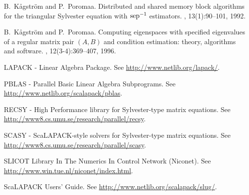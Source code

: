 \documentclass[11pt]{article}
\begin{document}
{\begin{thebibliography}{10}
B.~K{\aa}gstr{\"o}m and P.~Poromaa.
\newblock Distributed and shared memory block algorithms for the triangular
  {S}ylvester equation with {${\rm sep}\sp {-1}$} estimators.
, 13(1):90--101, 1992.

B.~K{\aa}gstr{\"o}m and P.~Poromaa.
\newblock Computing eigenspaces with specified eigenvalues of a regular matrix
  pair {$(A,B)$} and condition estimation: theory, algorithms and software.
, 12(3-4):369--407, 1996.

{LAPACK - Linear Algebra Package}.
\newblock See \url{http://www.netlib.org/lapack/}.

{PBLAS - Parallel Basic Linear Algebra Subprograms}.
\newblock See \url{http://www.netlib.org/scalapack/pblas}.

{RECSY - High Performance library for {S}ylvester-type matrix equations}.
\newblock See \url{http://www8.cs.umu.se/research/parallel/recsy}.

{SCASY - ScaLAPACK-style solvers for {S}ylvester-type matrix equations}.
\newblock See \url{http://www8.cs.umu.se/research/parallel/scasy}.

{SLICOT Library In The Numerics In Control Network (Niconet)}.
\newblock See \url{http://www.win.tue.nl/niconet/index.html}.

{ScaLAPACK Users' Guide}.
\newblock See \url{http://www.netlib.org/scalapack/slug/}.

\end{thebibliography}
}
\end{document}
